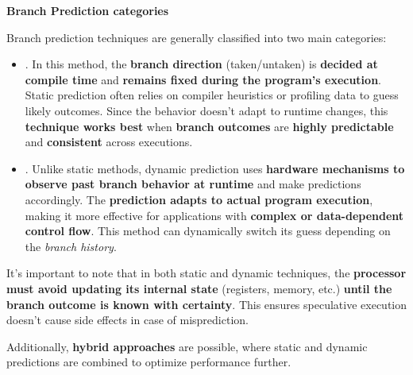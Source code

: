 \highspace
\begin{flushleft}
    \textcolor{Green3}{ \textbf{Branch Prediction categories}}
\end{flushleft}
Branch prediction techniques are generally classified into two main categories:
\begin{itemize}
    \item {}. In this method, the \textbf{branch direction} (taken/untaken) is \textbf{decided at compile time} and \textbf{remains fixed during the program's execution}. Static prediction often relies on compiler heuristics or profiling data to guess likely outcomes. Since the behavior doesn't adapt to runtime changes, this \textbf{technique works best} when \textbf{branch outcomes} are \textbf{highly predictable} and \textbf{consistent} across executions.

    \item {}. Unlike static methods, dynamic prediction uses \textbf{hardware mechanisms to observe past branch behavior at runtime} and make predictions accordingly. The \textbf{prediction adapts to actual program execution}, making it more effective for applications with \textbf{complex or data-dependent control flow}. This method can dynamically switch its guess depending on the \emph{branch history}.
\end{itemize}
It's important to note that in both static and dynamic techniques, the \textbf{processor must avoid updating its internal state} (registers, memory, etc.) \textbf{until the branch outcome is known with certainty}. This ensures speculative execution doesn't cause side effects in case of misprediction.

\highspace
Additionally, \textbf{hybrid approaches} are possible, where static and dynamic predictions are combined to optimize performance further.